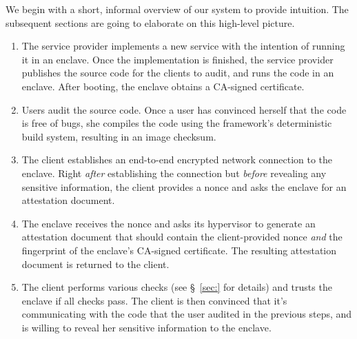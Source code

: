 We begin with a short, informal overview of our system to provide intuition.
The subsequent sections are going to elaborate on this high-level picture.  

\begin{enumerate}
    \item The service provider implements a new service with the intention of
      running it in an enclave.  Once the implementation is finished, the
      service provider publishes the source code for the clients to audit, and
      runs the code in an enclave.  After booting, the enclave obtains a
      CA-signed certificate.

    \item Users audit the source code.  Once a user has convinced herself that
      the code is free of bugs, she compiles the code using the framework's
      deterministic build system, resulting in an image checksum.

    \item The client establishes an end-to-end encrypted network connection to
      the enclave.  Right \emph{after} establishing the connection but
      \emph{before} revealing any sensitive information, the client provides a
      nonce and asks the enclave for an attestation document.

    \item The enclave receives the nonce and asks its hypervisor to generate an
      attestation document that should contain the client-provided nonce
      \emph{and} the fingerprint of the enclave's CA-signed certificate.  The
      resulting attestation document is returned to the client.

    \item The client performs various checks (see \S~\ref{sec:} for details) and
      trusts the enclave if all checks pass.  The client is then convinced that
      it's communicating with the code that the user audited in the previous
      steps, and is willing to reveal her sensitive information to the enclave.
\end{enumerate}


